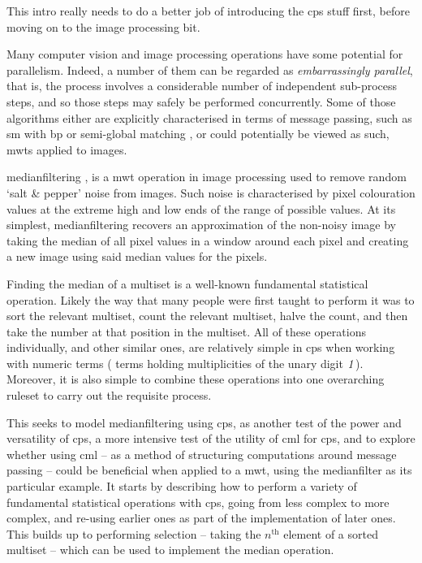 \begin{anfxerror}
This intro really needs to do a better job of introducing the \gls{cps} stuff first, before moving on to the image processing bit.
\end{anfxerror}

Many computer vision and image processing operations have some potential for parallelism.  Indeed, a number of them can be regarded as \emph{embarrassingly parallel}, that is, the process involves a considerable number of independent sub-process steps, and so those steps may safely be performed concurrently.  Some of those algorithms either are explicitly characterised in terms of message passing, such as \gls{sm} with \gls{bp} \cite{Liang2011} or semi-global matching \cite{Drory2014}, or could potentially be viewed as such, \eg{} \glspl{mwt} applied to images.

\Gls{medianfilter}ing \cite[Chap. 3.4.1]{Gimelfarb2018}, \cite{Fisher2016} is a \gls{mwt} operation in image processing used to remove random `salt \& pepper' noise from images.  Such noise is characterised by pixel colouration values at the extreme high and low ends of the range of possible values.  At its simplest, \gls{medianfilter}ing recovers an approximation of the non-noisy image by taking the median of all pixel values in a window around each pixel and creating a new image using said median values for the pixels.

Finding the median of a multiset is a well-known fundamental statistical operation.  Likely the way that many people were first taught to perform it was to sort the relevant multiset, count the relevant multiset, halve the count, and then take the number at that position in the multiset.  All of these operations individually, and other similar ones, are relatively simple in \gls{cps} when working with numeric terms (\ie{} terms holding multiplicities of the unary digit \(\mathit{1}\)).  Moreover, it is also simple to combine these operations into one overarching \gls{ruleset} to carry out the requisite process.

This  seeks to model \gls{medianfilter}ing using \gls{cps}, as another test of the power and versatility of \gls{cps}, a more intensive test of the utility of \gls{cml} for \gls{cps}, and to explore whether using \gls{cml} -- as a method of structuring computations around message passing -- could be beneficial when applied to a \gls{mwt}, using the \gls{medianfilter} as its particular example.  It starts by describing how to perform a variety of fundamental statistical operations with \gls{cps}, going from less complex to more complex, and re-using earlier ones as part of the implementation of later ones.  This builds up to performing selection -- taking the \(n^{\text{th}}\) element of a sorted multiset -- which can be used to implement the median operation.

